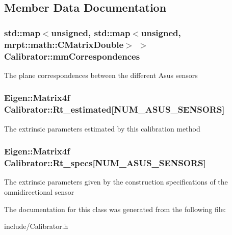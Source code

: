 \subsection{Member Data Documentation}
\hypertarget{classCalibrator_aa11e0d4221b509241235755dde78e3cc}{
\subsubsection[{mm\-Correspondences}]{\setlength{\rightskip}{0pt plus 5cm}std\-::map$<$unsigned, std\-::map$<$unsigned, mrpt\-::math\-::\-C\-Matrix\-Double$>$ $>$ Calibrator\-::mm\-Correspondences\hspace{0.3cm}{\ttfamily [private]}}}\label{classCalibrator_aa11e0d4221b509241235755dde78e3cc}
The plane correspondences between the different Asus sensors \hypertarget{classCalibrator_a664327b52485de0d402bbc896ce1233f}{
\subsubsection[{Rt\-\_\-estimated}]{\setlength{\rightskip}{0pt plus 5cm}Eigen\-::\-Matrix4f Calibrator\-::\-Rt\-\_\-estimated\mbox{[}N\-U\-M\-\_\-\-A\-S\-U\-S\-\_\-\-S\-E\-N\-S\-O\-R\-S\mbox{]}}}\label{classCalibrator_a664327b52485de0d402bbc896ce1233f}
The extrinsic parameters estimated by this calibration method \hypertarget{classCalibrator_ada5174649775a64c103833f87d90ec3e}{
\subsubsection[{Rt\-\_\-specs}]{\setlength{\rightskip}{0pt plus 5cm}Eigen\-::\-Matrix4f Calibrator\-::\-Rt\-\_\-specs\mbox{[}N\-U\-M\-\_\-\-A\-S\-U\-S\-\_\-\-S\-E\-N\-S\-O\-R\-S\mbox{]}}}\label{classCalibrator_ada5174649775a64c103833f87d90ec3e}
The extrinsic parameters given by the construction specifications of the omnidirectional sensor 

The documentation for this class was generated from the following file\-:\begin{DoxyCompactItemize}
\item 
include/Calibrator.\-h\end{DoxyCompactItemize}
